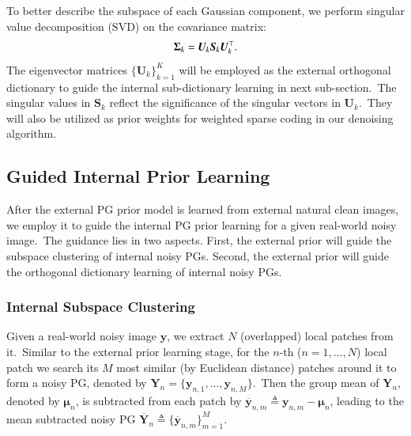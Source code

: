 To better describe the subspace of each Gaussian component, we perform singular value decomposition (SVD) \cite{eckart1936approximation} on the covariance matrix:
\vspace{-2mm}
\begin{equation}\label{equ3-2}
\vspace{-2mm}
\bm{\Sigma}_{k}=\bm{U}_{k}\bm{S}_{k}\bm{U}_{k}^{\top}.
\end{equation}
The eigenvector matrices $\{\bm{U}_{k}\}_{k=1}^{K}$ will be employed as the external orthogonal dictionary to guide the internal sub-dictionary learning in next sub-section.\ The singular values in $\bm{S}_{k}$ reflect the significance of the singular vectors in $\bm{U}_{k}$.\ They  will also be utilized as prior weights for weighted sparse coding in our denoising algorithm.


\subsection{Guided Internal Prior Learning}

After the external PG prior model is learned from external natural clean images, we employ it to guide the internal PG prior learning for a given real-world noisy image.\ The guidance lies in two aspects. First, the external prior will guide the subspace clustering of internal noisy PGs. Second, the external prior will guide the orthogonal dictionary learning of internal noisy PGs.

\subsubsection{Internal Subspace Clustering}

Given a real-world noisy image $\mathbf{y}$, we extract $N$ (overlapped) local patches from it.\ Similar to the external prior learning stage, for the $n$-th ($n=1,...,N$) local patch we search its $M$ most similar (by Euclidean distance) patches around it to form a noisy PG, denoted by $\bm{Y}_{n} = \{\mathbf{y}_{n,1},...,\mathbf{y}_{n,M}\}$.\ Then the group mean of $\bm{Y}_{n}$, denoted by $\bm{\mu}_{n}$, is subtracted from each patch by $\bm{\overline{y}}_{n,m}\triangleq\mathbf{y}_{n,m}-\bm{\mu}_{n}$, leading to the mean subtracted noisy PG $\bm{\overline{Y}}_{n}\triangleq \{\bm{\overline{y}}_{n,m}\}_{m=1}^{M}$.

